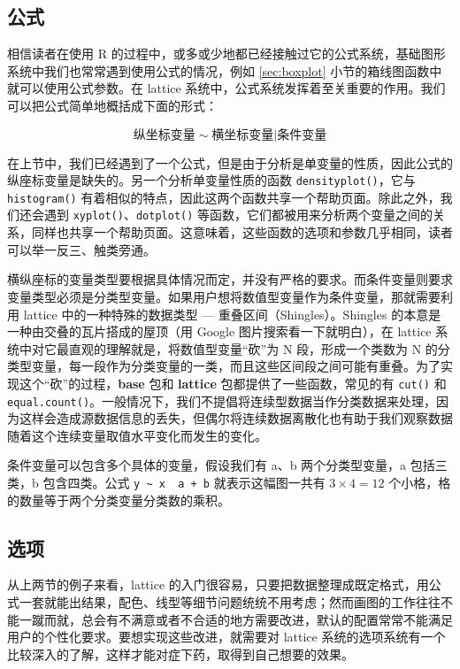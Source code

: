 \documentclass[
  b5paper,
  UTF8,twoside]{book}
\begin{document}
\hypertarget{ux516cux5f0f}{%
\subsection{公式}\label{ux516cux5f0f}}

相信读者在使用 R 的过程中，或多或少地都已经接触过它的公式系统，基础图形系统中我们也常常遇到使用公式的情况，例如 \ref{sec:boxplot} 小节的箱线图函数中就可以使用公式参数。在 lattice 系统中，公式系统发挥着至关重要的作用。我们可以把公式简单地概括成下面的形式：

\[\text{纵坐标变量}\sim\text{横坐标变量}|\text{条件变量}\]

在上节中，我们已经遇到了一个公式，但是由于分析是单变量的性质，因此公式的纵座标变量是缺失的。另一个分析单变量性质的函数 \texttt{densityplot()}，它与 \texttt{histogram()} 有着相似的特点，因此这两个函数共享一个帮助页面。除此之外，我们还会遇到 \texttt{xyplot()}、\texttt{dotplot()} 等函数，它们都被用来分析两个变量之间的关系，同样也共享一个帮助页面。这意味着，这些函数的选项和参数几乎相同，读者可以举一反三、触类旁通。

横纵座标的变量类型要根据具体情况而定，并没有严格的要求。而条件变量则要求变量类型必须是分类型变量。如果用户想将数值型变量作为条件变量，那就需要利用 lattice 中的一种特殊的数据类型 --- 重叠区间（Shingles）。Shingles 的本意是一种由交叠的瓦片搭成的屋顶（用 Google 图片搜索看一下就明白），在 lattice 系统中对它最直观的理解就是，将数值型变量``砍''为 N 段，形成一个类数为 N 的分类型变量，每一段作为分类变量的一类，而且这些区间段之间可能有重叠。为了实现这个``砍''的过程，\textbf{base} 包和 \textbf{lattice} 包都提供了一些函数，常见的有 \texttt{cut()} 和 \texttt{equal.count()}。一般情况下，我们不提倡将连续型数据当作分类数据来处理，因为这样会造成源数据信息的丢失，但偶尔将连续数据离散化也有助于我们观察数据随着这个连续变量取值水平变化而发生的变化。

条件变量可以包含多个具体的变量，假设我们有 a、b 两个分类型变量，a 包括三类，b 包含四类。公式 \texttt{y\ \textasciitilde{}\ x\ \textbar{}\ a\ +\ b} 就表示这幅图一共有 \(3\times4=12\) 个小格，格的数量等于两个分类变量分类数的乘积。

\hypertarget{ux9009ux9879}{%
\subsection{选项}\label{ux9009ux9879}}

从上两节的例子来看，lattice 的入门很容易，只要把数据整理成既定格式，用公式一套就能出结果，配色、线型等细节问题统统不用考虑；然而画图的工作往往不能一蹴而就，总会有不满意或者不合适的地方需要改进，默认的配置常常不能满足用户的个性化要求。要想实现这些改进，就需要对 lattice 系统的选项系统有一个比较深入的了解，这样才能对症下药，取得到自己想要的效果。
\end{document}
